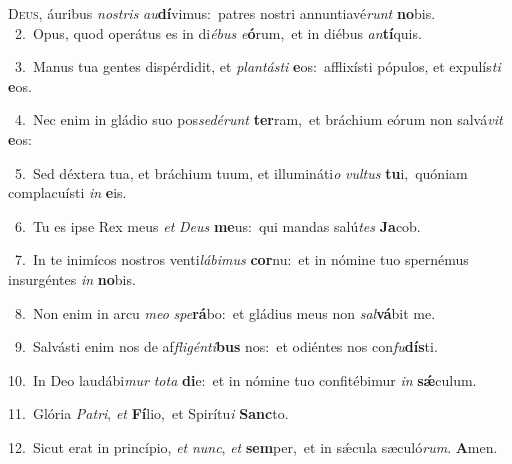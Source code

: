 \lettrine{\initial\textcolor{\initialcolor}{D}}{eus,} áuribus \textit{nos}\-\textit{tris} \textit{au}\-\textbf{dí}vimus:~\star patres nostri annuntiavé\textit{runt} \textbf{no}\-bis.\\
{\numbfont\textcolor{\numbcolor}{~2.}}~Opus, quod operátus es in di\-\textit{é}\-\textit{bus} \textit{e}\-\textbf{ó}rum,~\star et in diébus \textit{an}\-\textbf{tí}quis.\par
{\numbfont\textcolor{\numbcolor}{~3.}}~Manus tua gentes dispérdidit, et \textit{plan}\-\textit{tás}\textit{ti} \textbf{e}\-os:~\star afflixísti pópulos, et expulís\textit{ti} \textbf{e}\-os.\par
{\numbfont\textcolor{\numbcolor}{~4.}}~Nec enim in gládio suo pos\-\textit{se}\-\textit{dé}\textit{runt} \textbf{ter}\-ram,~\star et bráchium eórum non salvá\textit{vit} \textbf{e}\-os:\par
{\numbfont\textcolor{\numbcolor}{~5.}}~Sed déxtera tua, et bráchium tuum, et illumináti\textit{o} \textit{vul}\-\textit{tus} \textbf{tu}\-i,~\star quóniam complacuísti \textit{in} \textbf{e}\-is.\par
{\numbfont\textcolor{\numbcolor}{~6.}}~Tu es ipse Rex meus \textit{et} \textit{De}\-\textit{us} \textbf{me}\-us:~\star qui mandas salú\textit{tes} \textbf{Ja}\-cob.\par
{\numbfont\textcolor{\numbcolor}{~7.}}~In te inimícos nostros venti\-\textit{lá}\-\textit{bi}\textit{mus} \textbf{cor}\-nu:~\star et in nómine tuo spernémus insurgéntes \textit{in} \textbf{no}\-bis.\par
{\numbfont\textcolor{\numbcolor}{~8.}}~Non enim in arcu \textit{me}\-\textit{o} \textit{spe}\-\textbf{rá}bo:~\star et gládius meus non \textit{sal}\-\textbf{vá}bit me.\par
{\numbfont\textcolor{\numbcolor}{~9.}}~Salvásti enim nos de af\-\textit{fli}\-\textit{gén}\textit{ti}\textbf{bus} nos:~\star et odiéntes nos con\-\textit{fu}\-\textbf{dís}ti.\par
{\numbfont\textcolor{\numbcolor}{10.}}~In Deo laudábi\textit{mur} \textit{to}\-\textit{ta} \textbf{di}\-e:~\star et in nómine tuo confitébimur \textit{in} \textbf{sǽ}\-culum.\par
{\numbfont\textcolor{\numbcolor}{11.}}~Glória \textit{Pa}\-\textit{tri}, \textit{et} \textbf{Fí}\-lio,~\star et Spirítu\textit{i} \textbf{Sanc}\-to.\par
{\numbfont\textcolor{\numbcolor}{12.}}~Sicut erat in princípio, \textit{et} \textit{nunc}\-, \textit{et} \textbf{sem}\-per,~\star et in sǽcula sæculó\-\textit{rum}\-. \textbf{A}\-men.\par
